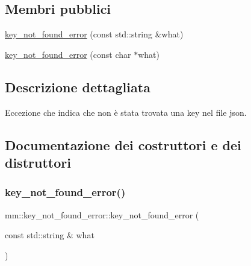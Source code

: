 \subsection*{Membri pubblici}
\begin{DoxyCompactItemize}
\item 
\hyperlink{classmm_1_1key__not__found__error_a2dbffa57a8ad2c3d80151f0d7b75814b}{key\+\_\+not\+\_\+found\+\_\+error} (const std\+::string \&what)
\item 
\hyperlink{classmm_1_1key__not__found__error_a650fb3f9d373793d9ba049e863eeef2d}{key\+\_\+not\+\_\+found\+\_\+error} (const char $\ast$what)
\end{DoxyCompactItemize}


\subsection{Descrizione dettagliata}
Eccezione che indica che non è stata trovata una key nel file json. 

\subsection{Documentazione dei costruttori e dei distruttori}
\mbox{\label{classmm_1_1key__not__found__error_a2dbffa57a8ad2c3d80151f0d7b75814b}} 
\subsubsection{\texorpdfstring{key\+\_\+not\+\_\+found\+\_\+error()}{key\_not\_found\_error()}\hspace{0.1cm}{\footnotesize\ttfamily [1/2]}}
{\footnotesize\ttfamily mm\+::key\+\_\+not\+\_\+found\+\_\+error\+::key\+\_\+not\+\_\+found\+\_\+error (\begin{DoxyParamCaption}\item[{const std\+::string \&}]{what }\end{DoxyParamCaption})}

\mbox{\label{classmm_1_1key__not__found__error_a650fb3f9d373793d9ba049e863eeef2d}} 
